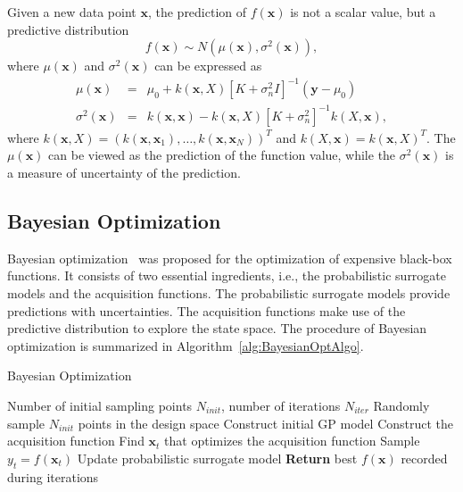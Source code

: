 Given a new data point $\bm{x}$, the prediction of $f(\bm{x})$ is
not a scalar value, but a predictive distribution
\begin{equation}
f(\bm{x}) \sim N(\mu(\bm{x}),
\sigma^2(\bm{x})),
\label{eq:GPRPred}
\end{equation}
where $\mu(\bm{x})$ and $\sigma^2(\bm{x})$ can be expressed as
\begin{equation}
        \begin{array}{lll}
            \mu(\bm{x})      &=& \mu_0 + k(\bm{x},X)[K+\sigma_n^2I]^{-1}(\bm{y} - \mu_0) \\
            \sigma^2(\bm{x}) &=& k(\bm{x}, \bm{x}) - k(\bm{x}, X)[K+\sigma_n^2]^{-1}k(X, \bm{x}),
        \end{array}
    \label{eq:GPRPredEqNoisy}
\end{equation}
where $k(\bm{x}, X) = (k(\bm{x}, \bm{x}_1), \dots, k(\bm{x},
\bm{x}_N))^T$ and $k(X, \bm{x}) = k(\bm{x}, X)^T$. The
$\mu(\bm{x})$ can be viewed as the prediction of the function value, while
the $\sigma^2(\bm{x})$ is a measure of uncertainty of the prediction.

\subsection{Bayesian Optimization}

Bayesian optimization~\cite{shahriari2016taking} was proposed for the
optimization of expensive black-box functions. It consists of two essential
ingredients, i.e., the probabilistic surrogate models and the acquisition
functions. The probabilistic surrogate models provide predictions with
uncertainties. The acquisition functions make use of the predictive
distribution to explore the state space. The procedure of Bayesian optimization
is summarized in Algorithm~\ref{alg:BayesianOptAlgo}.


\begin{algorithm}
    \caption{Bayesian Optimization}
    \label{alg:BayesianOptAlgo}
    \begin{algorithmic}[1]
        \REQUIRE Number of initial sampling points $N_{init}$, number of iterations $N_{iter}$
        \STATE Randomly sample $N_{init}$ points in the design space
        \STATE Construct initial GP model
        \STATE Construct the acquisition function
        \STATE Find $\bm{x}_t$ that optimizes the acquisition function
        \STATE Sample $y_t = f(\bm{x}_t)$
        \STATE Update probabilistic surrogate model
        \ENDFOR
        \STATE \textbf{Return} best $f(\bm{x})$ recorded during iterations
    \end{algorithmic}
\end{algorithm}

